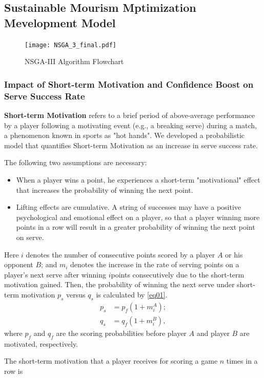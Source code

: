 \documentclass{mcmthesis}
\begin{document}
\subsection{Sustainable Mourism Mptimization Mevelopment Model}
\begin{figure}
  \centering
  \texttt{[image: NSGA\_3\_final.pdf]}
  \caption{NSGA-III Algorithm Flowchart} \label{fig:nsga}
\end{figure}
\subsubsection{Impact of Short-term Motivation and Confidence Boost on Serve Success Rate}
\textbf{Short-term Motivation} refers to a brief period of above-average performance by a player
following a motivating event (e.g., a breaking serve) during a match, a phenomenon known
in sports as "hot hands". We developed a probabilistic model that quantifies Short-term
Motivation as an increase in serve success rate.\par
The following two assumptions are necessary:
\begin{itemize}
  \item When a player wins a point, he experiences a short-term "motivational" effect that increases
  the probability of winning the next point.
  \item Lifting effects are cumulative. A string of successes may have a positive psychological
  and emotional effect on a player, so that a player winning more points in a row will result
  in a greater probability of winning the next point on serve.
\end{itemize}
Here $i$ denotes the number of consecutive points scored by a player $A$ or his opponent $B$;
and $m_i$ denotes the increase in the rate of serving points on a player’s next serve after winning
$i$points consecutively due to the short-term motivation gained. Then, the probability of winning
the next serve under short-term motivation $p_s$ versus $q_s$ is calculated by \eqref{eq01}.
\begin{equation}
  \begin{split}
    p_s &= p_f(1+m_i^A);\\
    q_s &= q_f(1+m_i^B),
  \end{split}
  \label{eq01}
\end{equation}
where $p_f$ and $q_f$ are the scoring probabilities before player $A$ and player $B$ are motivated,
respectively.\par
The short-term motivation that a player receives for scoring a game $n$ times in a row is
\end{document}
